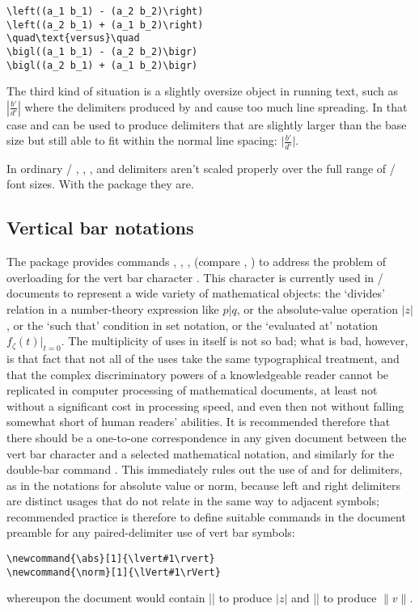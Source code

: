 \documentclass[leqno,titlepage,openany]{amsldoc}
\begin{document}
\begin{verbatim}
\left((a_1 b_1) - (a_2 b_2)\right)
\left((a_2 b_1) + (a_1 b_2)\right)
\quad\text{versus}\quad
\bigl((a_1 b_1) - (a_2 b_2)\bigr)
\bigl((a_2 b_1) + (a_1 b_2)\bigr)
\end{verbatim}
The third kind of situation is a slightly oversize object in running
text, such as $\left\lvert\frac{b'}{d'}\right\rvert$ where the
delimiters produced by  and  cause too much line
spreading. In that case  and  can be used to produce
delimiters that are slightly larger than the base size but still able to
fit within the normal line spacing:
$\bigl\lvert\frac{b'}{d'}\bigr\rvert$.

In ordinary \latex/ , , , and 
delimiters aren't scaled properly over the full range of \latex/ font
sizes.  With the  package they are.

\subsection{Vertical bar notations}

The  package provides commands , ,
,  (compare , ) to address the
problem of overloading for the vert bar character \qc{\|}. This
character is currently used in \latex/ documents to represent a wide
variety of mathematical objects: the `divides' relation in a
number-theory expression like $p\vert q$, or the absolute-value
operation $\lvert z\rvert$, or the `such that' condition in set
notation, or the `evaluated at' notation $f_\zeta(t)\bigr\rvert_{t=0}$.
The multiplicity of uses in itself is not so bad; what is bad, however,
is that fact that not all of the uses take the same typographical
treatment, and that the complex discriminatory powers of a knowledgeable
reader cannot be replicated in computer processing of mathematical
documents, at least not without a significant cost in processing speed,
and even then not without falling somewhat short of human readers'
abilities. It is recommended therefore that there should be a one-to-one
correspondence in any given document between the vert bar character
\qc{\|} and a selected mathematical notation, and similarly for the
double-bar command \cn{\|}. This immediately rules out the use of \qc{|}
and \ncn{\|} for delimiters, as in the notations for
absolute value or norm, because left and right delimiters are distinct
usages that do not relate in the same way to adjacent symbols;
recommended practice is therefore to define suitable commands in the
document preamble for any paired-delimiter use of vert bar symbols:
\begin{verbatim}
\newcommand{\abs}[1]{\lvert#1\rvert}
\newcommand{\norm}[1]{\lVert#1\rVert}
\end{verbatim}
whereupon the document would contain || to produce $\lvert
z\rvert$ and || to produce $\lVert v\rVert$.
\end{document}
